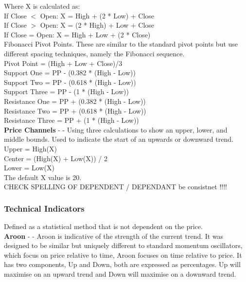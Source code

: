\documentclass[conference]{IEEEtran}
\begin{document}
\noindent
Where X is calculated as: \\
If Close $<$ Open: X = High + (2 * Low) + Close\\
If Close $>$ Open: X = (2 * High) + Low + Close\\
If Close = Open: X = High + Low + (2 * Close)\\

\noindent
Fibonacci Pivot Points. These are similar to the standard pivot points but use different spacing techniques, namely the Fibonacci sequence.\\
Pivot Point = (High + Low + Close)/3\\
Support One = PP - (0.382 * (High  -  Low))\\
Support Two = PP - (0.618 * (High  -  Low))\\
Support Three = PP - (1 * (High  -  Low))\\
Resistance One = PP + (0.382 * (High  -  Low))\\
Resistance Two = PP + (0.618 * (High  -  Low))\\
Resistance Three = PP + (1 * (High  -  Low))\\

\noindent
\textbf{Price Channels} - \cite{Murphy1999} - Using three calculations to show an upper, lower, and middle bounds. Used to indicate the start of an upwards or downward trend.\\

\noindent
Upper = High(X)\\
Center = (High(X) + Low(X)) / 2\\
Lower = Low(X)\\
The default X value is 20.\\

CHECK SPELLING OF DEPENDENT / DEPENDANT be consistnet !!!!

\subsubsection{Technical Indicators} Defined as a statistical method that is not dependent on the price. \\

\textbf{Aroon} - \cite{Chande1994} - Aroon is indicative of the strength of the current trend. It was designed to be similar but uniquely different to standard momentum oscillators, which focus on price relative to time, Aroon focuses on time relative to price. It has two components, Up and Down, both are expressed as percentages. Up will maximise on an upward trend and Down will maximise on a downward trend.\\
\end{document}
